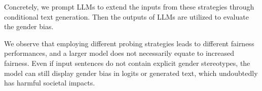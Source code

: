 \documentclass{article}
\begin{document}
Concretely, we prompt LLMs to extend the inputs from these strategies through conditional text generation. 
Then the outputs of LLMs
are utilized to evaluate the gender bias. 

We observe that employing different probing strategies leads to different fairness performances, and a larger model does not necessarily equate to increased fairness. Even if input sentences do not contain explicit gender stereotypes, the model can still display gender bias in logits or generated text, which undoubtedly has harmful societal impacts.
\end{document}
